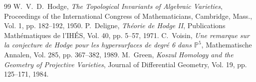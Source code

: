 \documentclass[11pt,a4paper]{article}
\theoremstyle{definition}
\begin{document}
\begin{thebibliography}{99}
 W.~V.~D.~Hodge, \emph{The Topological Invariants of Algebraic Varieties}, Proceedings of the International Congress of Mathematicians, Cambridge, Mass., Vol. 1, pp. 182--192, 1950.
 P.~Deligne, \emph{Th\'eorie de Hodge II}, Publications Math\'ematiques de l'IH\'ES, Vol. 40, pp. 5--57, 1971.
 C.~Voisin, \emph{Une remarque sur la conjecture de Hodge pour les hypersurfaces de degr\'e 6 dans $\mathbb{P}^5$}, Mathematische Annalen, Vol. 285, pp. 367--382, 1989.
 M.~Green, \emph{Koszul Homology and the Geometry of Projective Varieties}, Journal of Differential Geometry, Vol. 19, pp. 125--171, 1984.
\end{thebibliography}
\end{document}
